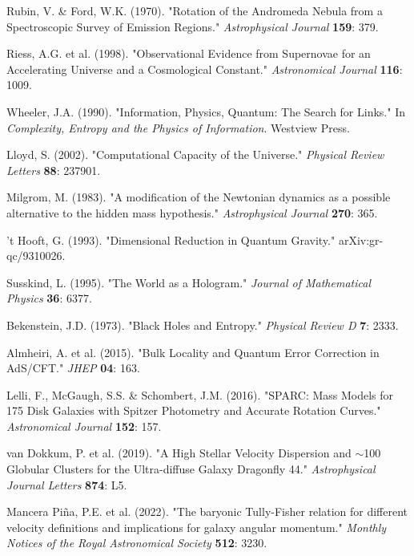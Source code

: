 \documentclass[twocolumn,prd,amsmath,amssymb,aps,superscriptaddress,nofootinbib]{revtex4-2}
\begin{document}
\begin{thebibliography}{99}
 Rubin, V. \& Ford, W.K. (1970). "Rotation of the Andromeda Nebula from a Spectroscopic Survey of Emission Regions." \textit{Astrophysical Journal} \textbf{159}: 379.

 Riess, A.G. et al. (1998). "Observational Evidence from Supernovae for an Accelerating Universe and a Cosmological Constant." \textit{Astronomical Journal} \textbf{116}: 1009.

 Wheeler, J.A. (1990). "Information, Physics, Quantum: The Search for Links." In \textit{Complexity, Entropy and the Physics of Information}. Westview Press.

 Lloyd, S. (2002). "Computational Capacity of the Universe." \textit{Physical Review Letters} \textbf{88}: 237901.

 Milgrom, M. (1983). "A modification of the Newtonian dynamics as a possible alternative to the hidden mass hypothesis." \textit{Astrophysical Journal} \textbf{270}: 365.

 't Hooft, G. (1993). "Dimensional Reduction in Quantum Gravity." arXiv:gr-qc/9310026.

 Susskind, L. (1995). "The World as a Hologram." \textit{Journal of Mathematical Physics} \textbf{36}: 6377.

 Bekenstein, J.D. (1973). "Black Holes and Entropy." \textit{Physical Review D} \textbf{7}: 2333.

 Almheiri, A. et al. (2015). "Bulk Locality and Quantum Error Correction in AdS/CFT." \textit{JHEP} \textbf{04}: 163.

 Lelli, F., McGaugh, S.S. \& Schombert, J.M. (2016). "SPARC: Mass Models for 175 Disk Galaxies with Spitzer Photometry and Accurate Rotation Curves." \textit{Astronomical Journal} \textbf{152}: 157.

 van Dokkum, P. et al. (2019). "A High Stellar Velocity Dispersion and $\sim$100 Globular Clusters for the Ultra-diffuse Galaxy Dragonfly 44." \textit{Astrophysical Journal Letters} \textbf{874}: L5.

 Mancera Piña, P.E. et al. (2022). "The baryonic Tully-Fisher relation for different velocity definitions and implications for galaxy angular momentum." \textit{Monthly Notices of the Royal Astronomical Society} \textbf{512}: 3230.
\end{thebibliography}
\end{document}
